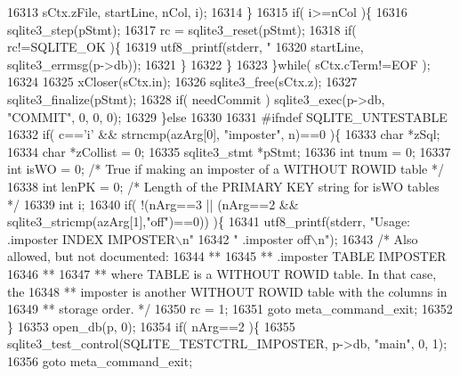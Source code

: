 \begin{DoxyCode}
{{{{{{{{{{{{{{{{{{{{{{{{{{{{{{{{{{{16313                         sCtx.zFile, startLine, nCol, i);
16314       \}
16315       \textcolor{keywordflow}{if}( i>=nCol )\{
16316         sqlite3_step(pStmt);
16317         rc = sqlite3_reset(pStmt);
16318         \textcolor{keywordflow}{if}( rc!=SQLITE_OK )\{
16319           utf8_printf(stderr, \textcolor{stringliteral}{"%
16320                       startLine, sqlite3_errmsg(p->db));
16321         \}
16322       \}
16323     \}\textcolor{keywordflow}{while}( sCtx.cTerm!=EOF );
16324 
16325     xCloser(sCtx.in);
16326     sqlite3_free(sCtx.z);
16327     sqlite3_finalize(pStmt);
16328     \textcolor{keywordflow}{if}( needCommit ) sqlite3_exec(p->db, \textcolor{stringliteral}{"COMMIT"}, 0, 0, 0);
16329   \}\textcolor{keywordflow}{else}
16330 
16331 \textcolor{preprocessor}{#ifndef SQLITE\_UNTESTABLE}
16332   \textcolor{keywordflow}{if}( c==\textcolor{charliteral}{'i'} && strncmp(azArg[0], \textcolor{stringliteral}{"imposter"}, n)==0 )\{
16333     \textcolor{keywordtype}{char} *zSql;
16334     \textcolor{keywordtype}{char} *zCollist = 0;
16335     sqlite3_stmt *pStmt;
16336     \textcolor{keywordtype}{int} tnum = 0;
16337     \textcolor{keywordtype}{int} isWO = 0;  \textcolor{comment}{/* True if making an imposter of a WITHOUT ROWID table */}
16338     \textcolor{keywordtype}{int} lenPK = 0; \textcolor{comment}{/* Length of the PRIMARY KEY string for isWO tables */}
16339     \textcolor{keywordtype}{int} i;
16340     \textcolor{keywordflow}{if}( !(nArg==3 || (nArg==2 && sqlite3_stricmp(azArg[1],\textcolor{stringliteral}{"off"})==0)) )\{
16341       utf8_printf(stderr, \textcolor{stringliteral}{"Usage: .imposter INDEX IMPOSTER\(\backslash\)n"}
16342                           \textcolor{stringliteral}{"       .imposter off\(\backslash\)n"});
16343       \textcolor{comment}{/* Also allowed, but not documented:}
16344 \textcolor{comment}{      **}
16345 \textcolor{comment}{      **    .imposter TABLE IMPOSTER}
16346 \textcolor{comment}{      **}
16347 \textcolor{comment}{      ** where TABLE is a WITHOUT ROWID table.  In that case, the}
16348 \textcolor{comment}{      ** imposter is another WITHOUT ROWID table with the columns in}
16349 \textcolor{comment}{      ** storage order. */}
16350       rc = 1;
16351       \textcolor{keywordflow}{goto} meta\_command\_exit;
16352     \}
16353     open_db(p, 0);
16354     \textcolor{keywordflow}{if}( nArg==2 )\{
16355       sqlite3_test_control(SQLITE_TESTCTRL_IMPOSTER, p->db, \textcolor{stringliteral}{"main"}, 0, 1);
16356       \textcolor{keywordflow}{goto} meta\_command\_exit;
}}}}}}}}}}}}}}}}}}}}}}}}}}}}}}}}}}}}
\end{DoxyCode}
